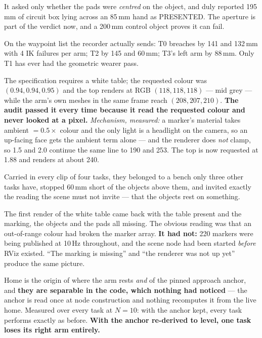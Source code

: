 {It asked only whether the pads were \emph{centred} on the object, and duly
reported 195\,mm of circuit box lying across an 85\,mm hand as PRESENTED. The
aperture is part of the verdict now, and a 200\,mm control object proves it can
fail.}

{On the waypoint list the recorder actually sends: T0 breaches by 141 and
132\,mm with 4 IK failures per arm; T2 by 145 and 60\,mm; T3's left arm by
88\,mm. Only T1 has ever had the geometric wearer pass.}

{The specification requires a white table; the requested colour was
$(0.94,0.94,0.95)$ and the top renders at RGB $(118,118,118)$ --- mid grey ---
while the arm's own meshes in the same frame reach $(208,207,210)$.
\textbf{The audit passed it every time because it read the requested colour and
never looked at a pixel.} \textit{Mechanism, measured:} a marker's material
takes ambient $= 0.5 \times$ colour and the only light is a headlight on the
camera, so an up-facing face gets the ambient term alone --- and the renderer
does \emph{not} clamp, so 1.5 and 2.0 continue the same line to 190 and 253. The
top is now requested at 1.88 and renders at about 240.}

{Carried in every clip of four tasks, they belonged to a bench only three other
tasks have, stopped 60\,mm short of the objects above them, and invited exactly
the reading the scene must not invite --- that the objects rest on something.}

{The first render of the white table came back with the table present and the
marking, the objects and the pads all missing. The obvious reading was that an
out-of-range colour had broken the marker array. \textbf{It had not:} 220
markers were being published at 10\,Hz throughout, and the scene node had been
started \emph{before} RViz existed. ``The marking is missing'' and ``the
renderer was not up yet'' produce the same picture.}

{Home is the origin of where the arm rests \emph{and} of the pinned approach
anchor, and \textbf{they are separable in the code, which nothing had noticed}
--- the anchor is read once at node construction and nothing recomputes it from
the live home. Measured over every task at $N=10$: with the anchor kept, every
task performs exactly as before. \textbf{With the anchor re-derived to level,
one task loses its right arm entirely.}}

